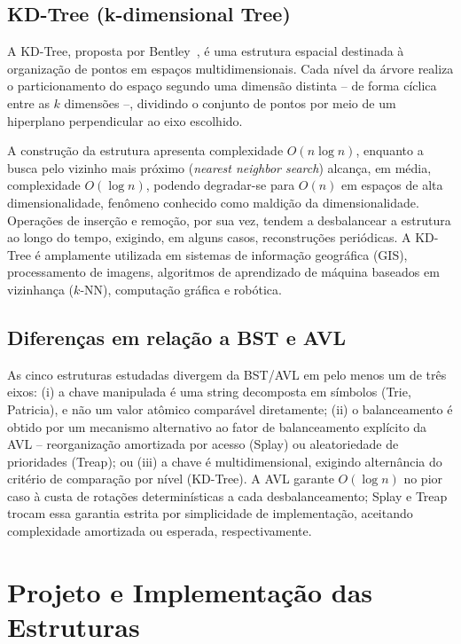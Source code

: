 \documentclass[conference]{IEEEtran}
\begin{document}
\subsection{KD-Tree (k-dimensional Tree)}

A KD-Tree, proposta por Bentley~\cite{bentley1975}, é uma estrutura espacial destinada à organização de pontos em espaços multidimensionais. Cada nível da árvore realiza o particionamento do espaço segundo uma dimensão distinta -- de forma cíclica entre as $k$ dimensões --, dividindo o conjunto de pontos por meio de um hiperplano perpendicular ao eixo escolhido.

A construção da estrutura apresenta complexidade $O(n \log n)$, enquanto a busca pelo vizinho mais próximo (\textit{nearest neighbor search}) alcança, em média, complexidade $O(\log n)$, podendo degradar-se para $O(n)$ em espaços de alta dimensionalidade, fenômeno conhecido como maldição da dimensionalidade. Operações de inserção e remoção, por sua vez, tendem a desbalancear a estrutura ao longo do tempo, exigindo, em alguns casos, reconstruções periódicas. A KD-Tree é amplamente utilizada em sistemas de informação geográfica (GIS), processamento de imagens, algoritmos de aprendizado de máquina baseados em vizinhança ($k$-NN), computação gráfica e robótica.

\subsection{Diferenças em relação a BST e AVL}

As cinco estruturas estudadas divergem da BST/AVL em pelo menos um de três eixos: (i) a chave manipulada é uma string decomposta em símbolos (Trie, Patricia), e não um valor atômico comparável diretamente; (ii) o balanceamento é obtido por um mecanismo alternativo ao fator de balanceamento explícito da AVL -- reorganização amortizada por acesso (Splay) ou aleatoriedade de prioridades (Treap); ou (iii) a chave é multidimensional, exigindo alternância do critério de comparação por nível (KD-Tree). A AVL garante $O(\log n)$ no pior caso à custa de rotações determinísticas a cada desbalanceamento; Splay e Treap trocam essa garantia estrita por simplicidade de implementação, aceitando complexidade amortizada ou esperada, respectivamente.

\section{Projeto e Implementação das Estruturas}
\end{document}
